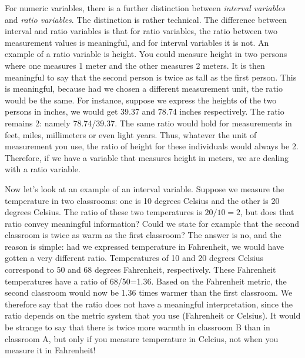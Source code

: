 \documentclass[]{book}\usepackage[]{graphicx}\usepackage[]{color}
\begin{document}
For numeric variables, there is a further distinction between \textit{interval variables} and \textit{ratio variables}. The distinction is rather technical. The difference between interval and ratio variables is that for ratio variables, the ratio between two measurement values is meaningful, and for interval variables it is not. An example of a ratio variable is height. You could measure height in two persons where one measures 1 meter and the other measures 2 meters. It is then meaningful to say that the second person is twice as tall as the first person. This is meaningful, because had we chosen a different measurement unit, the ratio would be the same. For instance, suppose we express the heights of the two persons in inches, we would get 39.37 and 78.74 inches respectively. The ratio remains 2: namely 78.74/39.37. The same ratio would hold for measurements in feet, miles, millimeters or even light years. Thus, whatever the unit of measurement you use, the ratio of height for these individuals would always be 2. Therefore, if we have a variable that measures height in meters, we are dealing with a ratio variable. 




% 



Now let's look at an example of an interval variable. Suppose we measure the temperature in two classrooms: one is 10 degrees Celsius and the other is 20 degrees Celsius. The ratio of these two temperatures is $20/10=2$, but does that ratio convey meaningful information? Could we state for example that the second classroom is twice as warm as the first classroom? The answer is no, and the reason is simple: had we expressed temperature in Fahrenheit, we would have gotten a very different ratio. Temperatures of 10 and 20 degrees Celsius correspond to 50 and 68 degrees Fahrenheit, respectively. These Fahrenheit temperatures have a ratio of 68/50=1.36. Based on the Fahrenheit metric, the second classroom would now be 1.36 times warmer than the first classroom. We therefore say that the ratio does not have a meaningful interpretation, since the ratio depends on the metric system that you use (Fahrenheit or Celsius). It would be strange to say that there is twice more warmth in classroom B than in classroom A, but only if you measure temperature in Celcius, not when you measure it in Fahrenheit!
\end{document}
